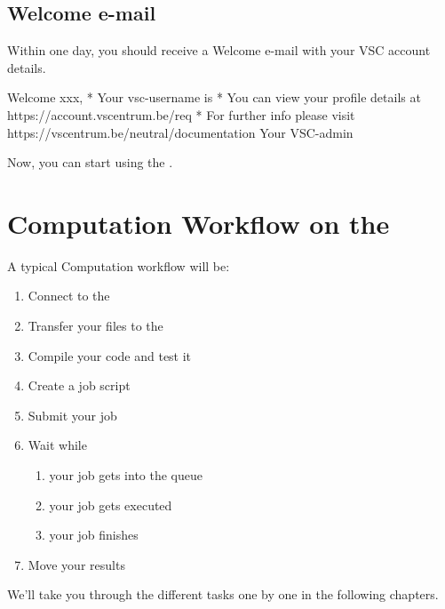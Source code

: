 \subsection{Welcome e-mail}
\label{sec:welcome-email}

Within one day, you should receive a Welcome e-mail with your VSC account details.

\begin{flattext}
Welcome xxx,
* Your vsc-username is %
* You can view your profile details at https://account.vscentrum.be/req
* For further info please visit https://vscentrum.be/neutral/documentation
Your VSC-admin
\end{flattext}

Now, you can start using the \hpc.

\section{Computation Workflow on the \hpc}
\label{sec:compuation-workflow-on-the-hpc}

A typical Computation workflow will be:

\begin{enumerate}
  \item  Connect to the \hpc
  \item  Transfer your files to the \hpc
  \item  Compile your code and test it
  \item  Create a job script
  \item  Submit your job
  \item  Wait while
  \begin{enumerate}
    \item  your job gets into the queue
    \item  your job gets executed
    \item  your job finishes
  \end{enumerate}
  \item  Move your results
\end{enumerate}

We'll take you through the different tasks one by one in the following
chapters.
